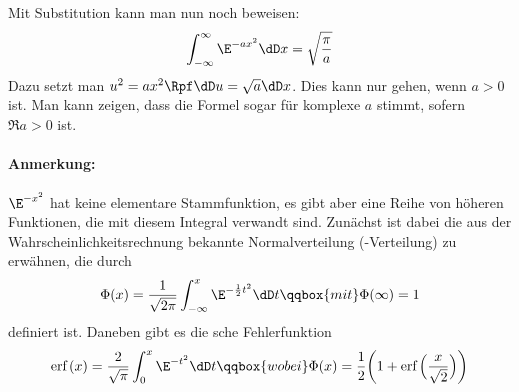 Mit Substitution kann man nun noch beweisen:
\[
\int_{-\infty}^{\infty}\E^{-a x^2}\dD x=\sqrt{\frac{\pi}{a}}
\]
Dazu setzt man $u^2=ax^2\Rpf\dD u=\sqrt{a}\dD x$. Dies kann nur gehen, wenn
$a>0$ ist. Man kann zeigen, dass die Formel sogar für komplexe $a$ stimmt,
sofern $\Re a>0$ ist.

\paragraph{Anmerkung:} $\E^{-x^2}$ hat keine elementare Stammfunktion, es gibt
aber eine Reihe von höheren Funktionen, die mit diesem Integral verwandt sind.
Zunächst ist dabei die aus der Wahrscheinlichkeitsrechnung bekannte
Normalverteilung (-Verteilung) zu erwähnen, die durch
\[
\Phi(x)=\frac{1}{\sqrt{2\pi}}\int_{-\infty}^x\E^{-\frac{1}{2}t^2}\dD t
\qqbox{mit}\Phi(\infty)=1
\]
definiert ist. Daneben gibt es die sche Fehlerfunktion
\[
\textrm{erf}\,(x)=\frac{2}{\sqrt{\pi}}\int_0^x\E^{-t^2}\dD t\qqbox{wobei}
\Phi(x)=\frac{1}{2}\biggl(1+\textrm{erf}\,\Bigl(\frac{x}{\sqrt{2}}\Bigr)\biggr)
\]

